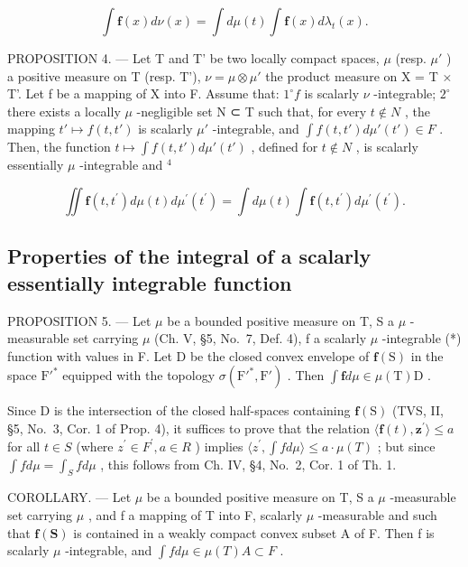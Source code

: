 \[
\int \mathbf {f} (x) d \nu (x) = \int d \mu (t) \int \mathbf {f} (x) d \lambda_ {t} (x).
\]

PROPOSITION 4. --- Let T and T' be two locally compact spaces, \(\mu\) (resp. \(\mu'\) ) a positive measure on T (resp. T'), \(\nu = \mu \otimes \mu'\) the product measure on X = T × T'. Let f be a mapping of X into F. Assume that: \(1^{\circ} f\) is scalarly \(\nu\) -integrable; \(2^{\circ}\) there exists a locally \(\mu\) -negligible set N ⊂ T such that, for every \(t \notin N\) , the mapping \(t' \mapsto f(t, t')\) is scalarly \(\mu'\) -integrable, and \(\int f(t, t') d\mu'(t') \in F\) . Then, the function \(t \mapsto \int f(t, t') d\mu'(t')\) , defined for \(t \notin N\) , is scalarly essentially \(\mu\) -integrable and \(^{4}\)

\[
\iint \mathbf {f} (t, t ^ {\prime}) d \mu (t) d \mu^ {\prime} (t ^ {\prime}) = \int d \mu (t) \int \mathbf {f} (t, t ^ {\prime}) d \mu^ {\prime} (t ^ {\prime}).
\]

\subsection{Properties of the integral of a scalarly essentially integrable function}

PROPOSITION 5. --- Let \(\mu\) be a bounded positive measure on T, S a \(\mu\) -measurable set carrying \(\mu\) (Ch. V, §5, No.~7, Def. 4), f a scalarly \(\mu\) -integrable (*) function with values in F. Let D be the closed convex envelope of \(\mathbf{f}(\mathrm{S})\) in the space \(\mathrm{F}'^*\) equipped with the topology \(\sigma(\mathrm{F}'^*, \mathrm{F}')\) . Then \(\int \mathbf{f} d\mu \in \mu(\mathrm{T})\mathrm{D}\) .

Since D is the intersection of the closed half-spaces containing \(\mathbf{f}(\mathrm{S})\) (TVS, II, §5, No.~3, Cor. 1 of Prop. 4), it suffices to prove that the relation \(\langle\mathbf{f}(t),\mathbf{z}^{\prime}\rangle\leqslant a\) for all \(t\in S\) (where \(z^{\prime}\in F^{\prime},a\in R\) ) implies \(\langle z^{\prime},\int f d\mu\rangle\leqslant a\cdot\mu(T)\) ; but since \(\int f d\mu=\int_{S}f d\mu\) , this follows from Ch. IV, §4, No.~2, Cor. 1 of Th. 1.

COROLLARY. --- Let \(\mu\) be a bounded positive measure on T, S a \(\mu\) -measurable set carrying \(\mu\) , and f a mapping of T into F, scalarly \(\mu\) -measurable and such that \(\mathbf{f}(\mathbf{S})\) is contained in a weakly compact convex subset A of F. Then f is scalarly \(\mu\) -integrable, and \(\int f d\mu \in \mu(T)A \subset F\) .

